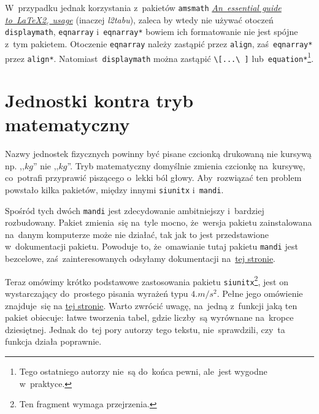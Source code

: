 \documentclass[a4paper,11pt]{article}
\newcommand{\tbs}{\textbackslash}  %
\begin{document}
\begin{enumerate}
  W~przypadku jednak korzystania z~pakietów \texttt{amsmath}
  \href{ftp://ftp.gust.org.pl/TeX/info/l2tabu/english/l2tabuen.pdf}{\emph{An~essential
      guide to~\LaTeX 2$_{ \varepsilon}$ usage}} (inaczej
  \emph{l2tabu}), zaleca by wtedy nie używać otoczeń
  \texttt{displaymath}, \texttt{eqnarray} i~\texttt{eqnarray*} bowiem
  ich formatowanie nie jest spójne z~tym pakietem. Otoczenie
  \texttt{eqnarray} należy zastąpić przez \texttt{align},
  zaś~\texttt{eqnarray*} przez \texttt{align*}.
  Natomiast~\texttt{displaymath} można zastąpić \texttt{\tbs [...\tbs
    ]} lub~\texttt{equation*}\footnote{Tego ostatniego autorzy nie~są
    do~końca pewni, ale~jest wygodne w~praktyce.}.
\end{enumerate}





\section{Jednostki kontra tryb matematyczny}
\label{sec:jednostki}

Nazwy jednostek fizycznych powinny być pisane czcionką drukowaną nie
kursywą np. ,,$\si{kg}$'' nie ,,$kg$''. Tryb matematyczny domyślnie
zmienia czcionkę na~kursywę, co~potrafi przyprawić piszącego o~lekki
ból głowy. Aby~rozwiązać ten problem powstało kilka pakietów, między
innymi \texttt{siunitx} i~\texttt{mandi}.

Spośród tych dwóch \texttt{mandi} jest zdecydowanie ambitniejszy
i~bardziej rozbudowany. Pakiet zmienia~się na~tyle mocno, że~wersja
pakietu zainstalowana na~danym komputerze może nie działać, tak jak to
jest przedstawione w~dokumentacji pakietu. Powoduje to, że~omawianie
tutaj pakietu \texttt{mandi} jest bezcelowe, zaś~zainteresowanych
odsyłamy dokumentacji
na~\href{ftp://ftp.gust.org.pl/TeX/macros/latex/contrib/mandi/mandi.pdf}{tej
  stronie}.

Teraz omówimy krótko podstawowe zastosowania pakietu
\texttt{siunitx}\footnote{Ten fragment wymaga przejrzenia.}, jest on
wystarczający do~prostego pisania wyrażeń typu $4\si{.m/s^{ 2 }}$.
Pełne jego omówienie znajduje~się na
\href{ftp://ftp.gust.org.pl/TeX/macros/latex/contrib/siunitx/siunitx.pdf}{tej
  stronie}. Warto zwrócić uwagę, na~jedną z~funkcji jaką ten pakiet
obiecuje: łatwe tworzenia tabel, gdzie liczby~są wyrównane na~kropce
dziesiętnej. Jednak do~tej pory autorzy tego tekstu, nie~sprawdzili,
czy~ta funkcja działa poprawnie.
\end{document}
